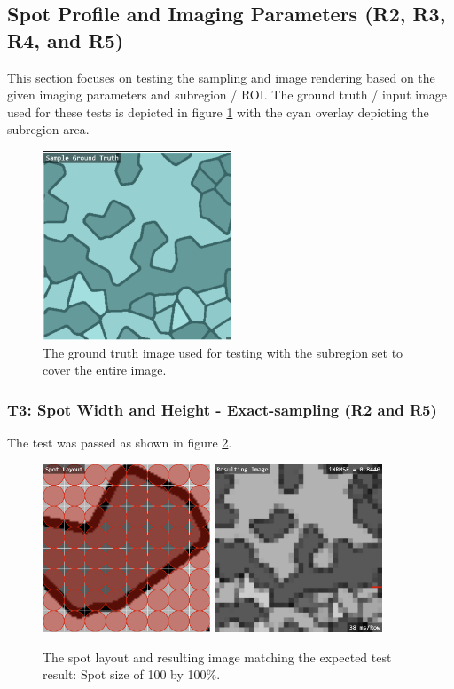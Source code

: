 \documentclass[12pt, titlepage]{article}
\begin{document}
\subsection{Spot Profile and Imaging Parameters (R2, R3, R4, and R5)}
This section focuses on testing the sampling and image rendering based on the given
imaging parameters and subregion / ROI. The ground truth / input image used for these tests
is depicted in figure \ref{fig_gt0} with the cyan overlay depicting the subregion area.

\begin{figure}[h!]
  \begin{center}
   \includegraphics[width=0.5\textwidth]{gt0.png}
  \caption{The ground truth image used for testing with the subregion set to cover the entire image.}
  \label{fig_gt0} 
  \end{center}
\end{figure}


\subsubsection{T3: Spot Width and Height - Exact-sampling (R2 and R5)}
The test was passed as shown in figure \ref{fig_t3}.
\begin{figure}[h!]
  \begin{center}
   \includegraphics[width=5cm]{t3a.png}
   \includegraphics[width=5cm]{t3b.png}
  \caption{The spot layout and resulting image matching the expected test result:
  Spot size of 100 by 100\%.}
  \label{fig_t3} 
  \end{center}
\end{figure}
\end{document}
